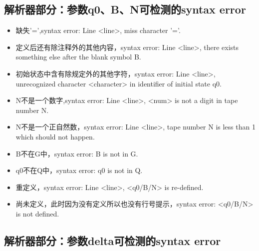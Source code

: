 \documentclass[UTF8]{article}
\begin{document}
\subsection{解析器部分：参数q0、B、N可检测的syntax error}
\begin{itemize}
    \item 缺失'=',syntax error: Line <line>, miss character '='.  
    \item 定义后还有除注释外的其他内容，syntax error: Line <line>, there exists something else after the blank symbol B.
    \item 初始状态中含有除规定外的其他字符，syntax error: Line <line>, unrecognized character <character> in identifier of initial state q0.
	\item N不是一个数字,syntax error: Line <line>, <num> is not a digit in tape number N.
	\item N不是一个正自然数，syntax error: Line <line>, tape number N is less than 1 which should not happen.
    \item B不在G中，syntax error: B is not in G.
    \item q0不在Q中，syntax error: q0 is not in Q.
	\item 重定义，syntax error: Line <line>, <q0/B/N>  is re-defined.
    \item 尚未定义，此时因为没有定义所以也没有行号提示，syntax error: <q0/B/N> is not defined.
\end{itemize}

\subsection{解析器部分：参数delta可检测的syntax error}
\end{document}
